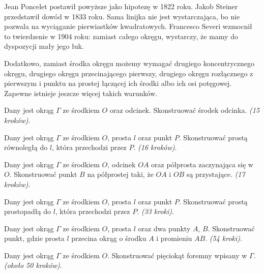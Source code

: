 Jean Poncelet postawił powyższe jako hipotezę w 1822 roku.
%
Jakob Steiner przedstawił dowód w 1833 roku.
Sama linijka nie jest wystarczająca, bo nie pozwala na wyciąganie pierwiastków kwadratowych.
Francesco Severi wzmocnił to twierdzenie w 1904 roku: zamiast całego okręgu, wystarczy, że mamy do dyspozycji mały jego łuk.

Dodatkowo, zamiast środka okręgu możemy wymagać drugiego koncentrycznego okręgu, drugiego okręgu przecinającego pierwszy, drugiego okręgu rozłącznego z pierwszym i punktu na prostej łączącej ich środki albo ich osi potęgowej.
Zapewne istnieje jeszcze więcej takich warunków.








\begin{problem}
    Dany jest okrąg $\Gamma$ ze środkiem $O$ oraz odcinek.
    Skonstruować środek odcinka. \hfill \emph{(15 kroków)}. %
\end{problem}

\begin{problem}
    Dany jest okrąg $\Gamma$ ze środkiem $O$, prosta $l$ oraz punkt $P$.
    Skonstruować prostą równoległą do $l$, która przechodzi przez $P$. \hfill \emph{(16 kroków)}. %
\end{problem}

\begin{problem}
    Dany jest okrąg $\Gamma$ ze środkiem $O$, odcinek $OA$ oraz półprosta zaczynająca się w $O$.
    Skonstruować punkt $B$ na półprostej taki, że $OA$ i $OB$ są przystające. \hfill \emph{(17 kroków)}. %
\end{problem}

\begin{problem}
    Dany jest okrąg $\Gamma$ ze środkiem $O$, prosta $l$ oraz punkt $P$.
    Skonstruować prostą prostopadłą do $l$, która przechodzi przez $P$. \hfill \emph{(33 kroki)}. %
\end{problem}

\begin{problem}
    Dany jest okrąg $\Gamma$ ze środkiem $O$, prosta $l$ oraz dwa punkty $A$, $B$.
    Skonstruować punkt, gdzie prosta $l$ przecina okrąg o środku $A$ i promieniu $AB$. \hfill \emph{(54 kroki)}. %
\end{problem}

\begin{problem}
    Dany jest okrąg $\Gamma$ ze środkiem $O$.
    Skonstruować pięciokąt foremny wpisany w $\Gamma$. \hfill \emph{(około 50 kroków)}. %
\end{problem}

